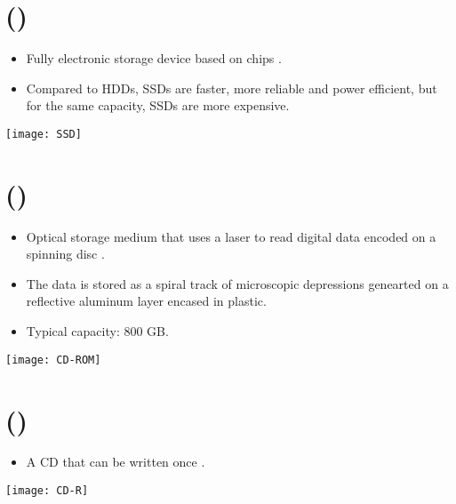 \section{ ()}
\begin{itemize}
\item Fully electronic storage device based on  chips \cite{wikipedia_SSD}.
\item Compared to \gls{HDD}s, \gls{SSD}s are faster, more reliable and
  power efficient, but for the same capacity, \gls{SSD}s are more
  expensive.
\end{itemize}
\vspace{-4ex}
\begin{center}
  \texttt{[image: SSD]}
\end{center}

\section{ ({)}}
\begin{itemize}
\item Optical storage medium that uses a laser to read digital data
  encoded on a spinning disc \cite{wikipedia_CD-ROM}.
\item The data is stored as a spiral track of microscopic depressions
  genearted on a reflective aluminum layer encased in plastic.
\item Typical capacity: 800 GB.
\end{itemize}
\vspace{-4ex}
\begin{center}
  \texttt{[image: CD-ROM]}
\end{center}
  
\section{ ({)}}
\begin{itemize}
\item A \gls{CD} that can be written once \cite{wikipedia_CD-R}.
\end{itemize}
\vspace{-4ex}
\begin{center}
  \texttt{[image: CD-R]}
\end{center}


